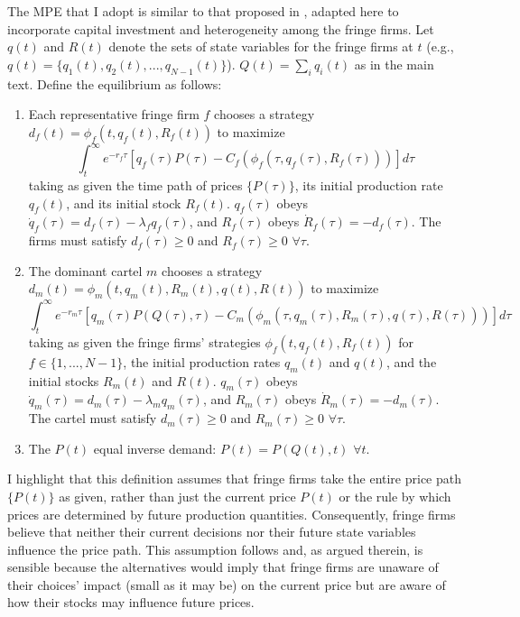 \documentclass[12pt]{article}
\begin{document}
The MPE that I adopt is similar to that proposed in \cite{benchekrounwithagen2012}, adapted here to incorporate capital investment and heterogeneity among the fringe firms. Let $q(t)$ and $R(t)$ denote the sets of state variables for the fringe firms at $t$ (e.g., $q(t)=\{q_1(t),q_2(t),...,q_{N-1}(t)\}$). $Q(t) = \sum_i q_i(t)$ as in the main text. Define the equilibrium as follows:
\begin{enumerate}
\item Each representative fringe firm $f$ chooses a strategy $d_f(t)=\phi_f(t,q_f(t),R_f(t))$ to maximize
\begin{equation}
\int_t^\infty e^{-r_f\tau} \left[q_f(\tau)P(\tau) - C_f(\phi_f(\tau,q_f(\tau),R_f(\tau))) \right] d\tau \label{eq:maximand_f}
\end{equation}
\noindent taking as given the time path of prices $\{P(\tau)\}$, its initial production rate $q_f(t)$, and its initial stock $R_f(t)$. $q_f(\tau)$ obeys $\dot{q}_f(\tau)=d_f(\tau)-\lambda_f q_f(\tau)$, and $R_f(\tau)$ obeys $\dot{R}_f(\tau)=-d_f(\tau)$. The firms must satisfy $d_f(\tau)\geq0$ and $R_f(\tau)\geq0$ $\forall \tau$.
\item The dominant cartel $m$ chooses a strategy $d_m(t)=\phi_m(t,q_m(t),R_m(t),q(t),R(t))$ to maximize
\begin{equation}
\int_t^\infty e^{-r_m\tau} \left[q_m(\tau)P(Q(\tau),\tau) - C_m(\phi_m(\tau,q_m(\tau),R_m(\tau),q(\tau),R(\tau))) \right] d\tau \label{eq:maximand_f}
\end{equation}
\noindent taking as given the fringe firms' strategies $\phi_f(t,q_f(t),R_f(t))$ for $f\in\{1,...,N-1\}$, the initial production rates $q_m(t)$ and $q(t)$, and the initial stocks $R_m(t)$ and $R(t)$. $q_m(\tau)$ obeys $\dot{q}_m(\tau)=d_m(\tau)-\lambda_m q_m(\tau)$, and $R_m(\tau)$ obeys $\dot{R}_m(\tau)=-d_m(\tau)$. The cartel must satisfy $d_m(\tau)\geq0$ and $R_m(\tau)\geq0$ $\forall \tau$.
\item The $P(t)$ equal inverse demand: $P(t)=P(Q(t),t)$ $\forall t$.
\end{enumerate}

I highlight that this definition assumes that fringe firms take the entire price path $\{P(t)\}$ as given, rather than just the current price $P(t)$ or the rule by which prices are determined by future production quantities. Consequently, fringe firms believe that neither their current decisions nor their future state variables influence the price path. This assumption follows \cite{benchekrounwithagen2012} and, as argued therein, is sensible because the alternatives would imply that fringe firms are unaware of their choices' impact (small as it may be) on the current price but are aware of how their stocks may influence future prices.
\end{document}
